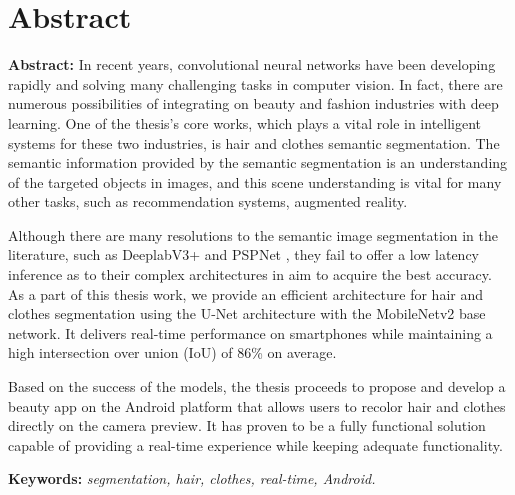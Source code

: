 \chapter*{Abstract}
\fontsize{12}{14}\selectfont
\textbf{Abstract: } In recent years, convolutional neural networks have been developing rapidly and solving many challenging tasks in computer vision. In fact, there are numerous possibilities of integrating on beauty and fashion industries with deep learning. One of the thesis's core works, which plays a vital role in intelligent systems for these two industries, is hair and clothes semantic segmentation. The semantic information provided by the semantic segmentation is an understanding of the targeted objects in images, and this scene understanding is vital for many other tasks, such as recommendation systems, augmented reality. \par


Although there are many resolutions to the semantic image segmentation in the literature, such as DeeplabV3+ \cite{deeplabv3plus} and PSPNet \cite{pspnet}, they fail to offer a low latency inference as to their complex architectures in aim to acquire the best accuracy. As a part of this thesis work, we provide an efficient architecture for hair and clothes segmentation using the U-Net architecture with the MobileNetv2 base network. It delivers real-time performance on smartphones while maintaining a high intersection over union (IoU) of 86\% on average. \par

Based on the success of the models, the thesis proceeds to propose and develop a beauty app on the Android platform that allows users to recolor hair and clothes directly on the camera preview. It has proven to be a fully functional solution capable of providing a real-time experience while keeping adequate functionality. \par


\textbf{Keywords: } \textit{segmentation, hair, clothes, real-time, Android.}